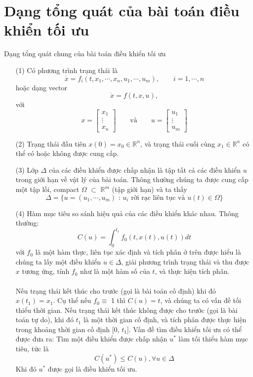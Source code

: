 \documentclass[12pt,a4paper]{report}
\begin{document}
	\section{Dạng tổng quát của bài toán điều khiển tối ưu}
	Dạng tổng quát chung của bài toán điều khiển tối ưu
	\begin{itemize}
		\item[(1)] Có phương trình trạng thái là $$\dot{x} = f_i(t,x_1,\cdots,x_n,u_1,\cdots, u_m), \qquad i = 1, \cdots, n$$ hoặc dạng vector $$\dot{x}=f(t,x,u),$$ với $$x = \begin{bmatrix}
			x_1\\\vdots\\ x_n
		\end{bmatrix} \qquad \text{và} \qquad u = \begin{bmatrix}
			u_1 \\\vdots\\u_m
		\end{bmatrix}$$
	\item[(2)] Trạng thái đầu tiên $x(0) = x_0 \in \mathbb{R}^n$, và trạng thái cuối cùng $x_1 \in \mathbb{R}^n$ có thể có hoặc không được cung cấp.
	\item[(3)] Lớp $\Delta$ của các điều khiển được chấp nhận là tập tất cả các điều khiển $u$ trong giới hạn về vật lý của bài toán. Thông thường chúng ta được cung cấp một tập lồi, compact $\Omega$ $\subset$ $\mathbb{R}^m$ (tập giới hạn) và ta thấy \begin{equation}
		\Delta = \{u=(u_1,\cdots, u_m) \text{ : $u_i$ rời rạc liên tục và $u(t) \in \Omega$}\} \nonumber
	\end{equation}
\item[(4)] Hàm mục tiêu so sánh hiệu quả của các điều khiển khác nhau. Thông thường: $$C(u) = \int_{0}^{t_1}f_0(t,x(t),u(t))dt$$ với $f_0$ là một hàm thực, liên tục xác định và tích phân ở trên được hiểu là chúng ta lấy một điều khiển $u\in\Delta$, giải phương trình trạng thái và thu được $x$ tương ứng, tính $f_0$ như là một hàm số của $t$, và thực hiện tích phân. \\\\ Nếu trạng thái kết thúc cho trước (gọi là bài toán cố định) khi đó $x(t_1)=x_1$. Cụ thể nếu $f_0 \equiv$ 1 thì $C(u)=t$, và chúng ta có vấn đề tối thiểu thời gian. Nếu trạng thái kết thúc không được cho trước (gọi là bài toán tự do), khi đó $t_1$ là một thời gian cố định, và tích phân được thực hiện trong khoảng thời gian cố định [0, $t_1$]. Vấn đề tìm điều khiển tối ưu có thể được đưa ra: Tìm một điều khiển được chấp nhận $u^*$ làm tối thiểu hàm mục tiêu, tức là $$C(u^*) \leq C(u), \forall u \in \Delta$$ Khi đó $u^*$ được gọi là điều khiển tối ưu.
	\end{itemize} 
\end{document}
